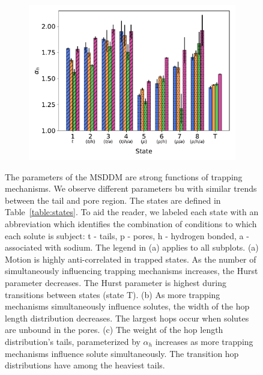 \documentclass{article}
\begin{document}
\begin{figure}
\begin{subfigure}{0.325\textwidth}
  \includegraphics[width=\textwidth]{alpha_v_state.pdf}
  \caption{}\label{fig:alpha_v_state}
  \end{subfigure}
  \caption{The parameters of the MSDDM are strong functions of trapping mechanisms.
  We observe different parameters bu with similar trends between the tail and pore
  region. The states are defined in Table~\ref{table:states}. To aid the reader, we 
  labeled each state with an abbreviation which identifies the combination of 
  conditions to which each solute is subject: t - tails, p - pores, h - hydrogen bonded, 
  a - associated with sodium. The legend in (a) applies to all subplots. (a) Motion is
  highly anti-correlated in trapped states. As the number of simultaneously influencing
  trapping mechanisms increases, the Hurst parameter decreases. The Hurst parameter is
  highest during transitions between states (state T). (b) As more trapping mechanisms
  simultaneously influence solutes, the width of the hop length distribution decreases.
  The largest hops occur when solutes are unbound in the pores. (c) The weight of the 
  hop length distribution's tails, parameterized by $\alpha_h$ increases as more trapping
  mechanisms influence solute simultaneously. The transition hop distributions have
  among the heaviest tails.}\label{fig:msddm_parameters}
  \end{figure}
\end{document}
